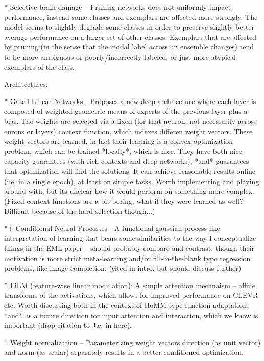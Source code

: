 * Selective brain damage -- Pruning networks does not uniformly impact performance, instead some classes and exemplars are affected more strongly. The model seems to slightly degrade some classes in order to preserve slightly better average performance on a larger set of other classes. Exemplars that are affected by pruning (in the sense that the modal label across an ensemble changes) tend to be more ambiguous or poorly/incorrectly labeled, or just more atypical exemplars of the class. \citep{Hooker2019}


Architectures:

* Gated Linear Networks - Proposes a new deep architecture where each layer is composed of weighted geometric means of experts of the previous layer plus a bias. The weights are selected via a fixed (for that neuron, not necessarily across eurons or layers) context function, which indexes differen weight vectors. These weight vectors are learned, in fact their learning is a convex optimization problem, which can be trained *locally*, which is nice. They have both nice capacity guarantees (with rich contexts and deep networks), *and* guarantees that optimization will find the solutions. It can achieve reasonable results online (i.e. in a single epoch), at least on simple tasks. Worth implementing and playing around with, but its unclear how it would perform on something more complex. (Fixed context functions are a bit boring, what if they were learned as well? Difficult because of the hard selection though...) \citep{Veness2017} 

*+ Conditional Neural Processes - A functional gaussian-process-like interpretation of learning that bears some similarities to the way I conceptualize things in the EML paper -- should probably compare and contrast, though their motivation is more strict meta-learning and/or fill-in-the-blank type regression problems, like image completion. \citep{Garnelo2018}  (cited in intro, but should discuss further)

* FiLM (feature-wise linear modulation): A simple attention mechnaism -- affine transforms of the activations, which allows for improved performance on CLEVR etc. Worth discussing both in the context of HoMM type function adaptation, *and* as a future direction for input attention and interaction, which we know is important (drop citation to Jay in here). \citep{Perez2018}

* Weight normalization -- Parameterizing weight vectors direction (as unit vector) and norm (as scalar) separately results in a better-conditioned optimization. \citep{Salimans2016}

